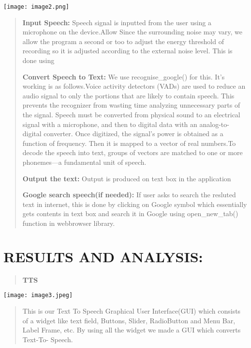 \documentclass[]{article}
\begin{document}
\texttt{[image: image2.png]}

\begin{quote}
\textbf{Input Speech:} Speech signal is inputted from the user using a
microphone on the device.Allow Since the surrounding noise may vary, we
allow the program a second or too to adjust the energy threshold of
recording so it is adjusted according to the external noise level. This
is done using

\textbf{Convert Speech to Text:} We use recognise\_google() for this.
It's working is as follows.Voice activity detectors (VADs) are used to
reduce an audio signal to only the portions that are likely to contain
speech. This prevents the recognizer from wasting time analyzing
unnecessary parts of the signal. Speech must be converted from physical
sound to an electrical signal with a microphone, and then to digital
data with an analog-to-digital converter. Once digitized, the signal's
power is obtained as a function of frequency. Then it is mapped to a
vector of real numbers.To decode the speech into text, groups of vectors
are matched to one or more phonemes---a fundamental unit of speech.

\textbf{Output the text:} Output is produced on text box in the
application

\textbf{Google search speech(if needed):} If user asks to search the
resluted text in internet, this is done by clicking on Google symbol
which essentially gets contents in text box and search it in Google
using open\_new\_tab() function in webbrowser library.
\end{quote}

\section{RESULTS AND ANALYSIS:}\label{results-and-analysis}

\begin{quote}
\textbf{TTS}
\end{quote}

\texttt{[image: image3.jpeg]}

\begin{quote}
This is our Text To Speech Graphical User Interface(GUI) which consists
of a widget like text ﬁeld, Buttons, Slider, RadioButton and Menu Bar,
Label Frame, etc. By using all the widget we made a GUI which converts
Text-To- Speech.
\end{quote}
\end{document}
